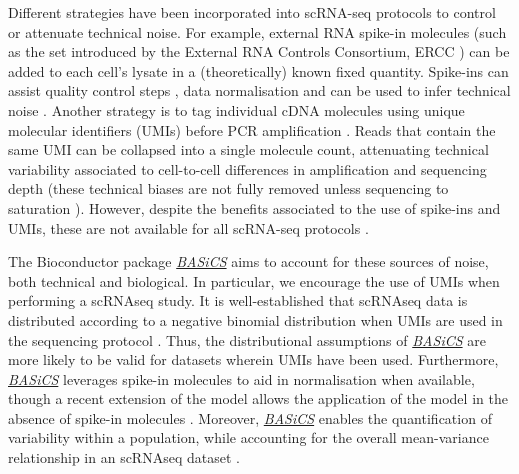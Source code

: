 \documentclass[9pt,a4paper,]{extarticle}
\begin{document}
Different strategies have been incorporated into scRNA-seq protocols to control
or attenuate technical noise.
For example, external RNA spike-in molecules (such as the set introduced by the
External RNA Controls Consortium, ERCC \citep{Rna2005}) can be added to each cell's
lysate in a (theoretically) known fixed quantity.
Spike-ins can assist quality control steps \citep{McCarthy2017}, data normalisation
\citep{Vallejos2017} and can be used to infer technical noise \citep{Brennecke2013}.
Another strategy is to tag individual cDNA molecules using unique molecular
identifiers (UMIs) before PCR amplification \citep{Islam2014}.
Reads that contain the same UMI can be collapsed into a single molecule count,
attenuating technical variability associated to cell-to-cell differences
in amplification and sequencing depth (these technical biases are not fully
removed unless sequencing to saturation \citep{Vallejos2017}).
However, despite the benefits associated to the use of spike-ins and UMIs,
these are not available for all scRNA-seq protocols \citep{Haque2017}.

The Bioconductor package \emph{\href{https://bioconductor.org/packages/3.11/BASiCS}{BASiCS}} aims to account for these
sources of noise, both technical and biological. In particular, we
encourage the use of UMIs when performing a scRNAseq study.
It is well-established that scRNAseq data is distributed
according to a negative binomial distribution when UMIs are used in the
sequencing protocol \citep{Svensson2020, Townes2020, Townes2019}. Thus, the
distributional assumptions of \emph{\href{https://bioconductor.org/packages/3.11/BASiCS}{BASiCS}} are more likely to be valid
for datasets wherein UMIs have been used. Furthermore,
\emph{\href{https://bioconductor.org/packages/3.11/BASiCS}{BASiCS}} leverages spike-in molecules to aid in normalisation when
available, though a recent extension of the model allows the application of
the model in the absence of spike-in molecules \citep{Eling2018}. Moreover,
\emph{\href{https://bioconductor.org/packages/3.11/BASiCS}{BASiCS}} enables the quantification of variability within a
population, while accounting for the overall mean-variance relationship in
an scRNAseq dataset \citep{Eling2018}.
\end{document}
